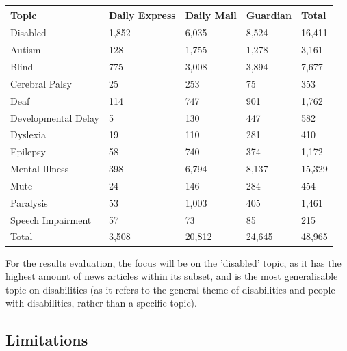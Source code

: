 \documentclass{report}
\begin{document}
\begin{center}
	\begin{tabu} to 1.0\textwidth { | X[c] | X[c] | X[c] | X[c] | X[c] | }
		\hline
		Topic & Daily Express & Daily Mail & Guardian & Total \\
		\hline
		Disabled & 1,852 & 6,035 & 8,524 & 16,411  \\
		\hline
		Autism & 128 & 1,755 & 1,278 & 3,161  \\
		\hline
		Blind & 775 & 3,008 & 3,894 & 7,677  \\
		\hline
		Cerebral Palsy & 25 & 253 & 75 & 353  \\
		\hline
		Deaf & 114 & 747 & 901 & 1,762  \\
		\hline
		Developmental Delay & 5 & 130 & 447 & 582  \\
		\hline
		Dyslexia & 19 & 110 & 281 & 410  \\
		\hline
		Epilepsy & 58 & 740 & 374 & 1,172  \\
		\hline
		Mental Illness & 398 & 6,794 & 8,137 & 15,329  \\
		\hline
		Mute & 24 & 146 & 284 & 454  \\  %
		\hline
		Paralysis & 53 & 1,003 & 405 & 1,461  \\
		\hline
		Speech Impairment & 57 & 73 & 85 & 215  \\
		\hline
		Total & 3,508 & 20,812 & 24,645 & 48,965  \\  %
		\hline
	\end{tabu}
\end{center}

For the results evaluation, the focus will be on the 'disabled' topic, as it has the highest amount of news articles within its subset, and is the most generalisable topic on disabilities (as it refers to the general theme of disabilities and people with disabilities, rather than a specific topic).

\subsection{Limitations} \label{limitations}
\end{document}
